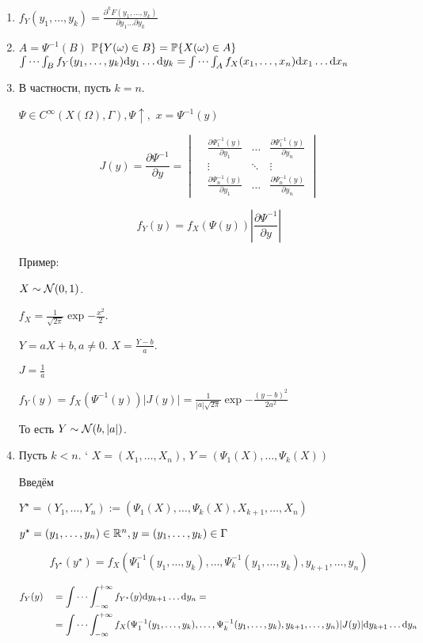 \begin{enumerate}
\def\labelenumi{\arabic{enumi}.}
\item
  \(f_Y (y_1,\ldots,y_k) = \frac{\partial^k F(y_1, \ldots, y_k)}{\partial y_1 \ldots \partial y_k}\)
\item
  \(A = \Psi^{-1}(B)\)
  \(\mathbb P\{ Y(\omega)\in B\} = \mathbb P\{ X(\omega)\in A\}\)
  \(\idotsint_B f_Y(y_1,\ldots,y_k) \mathrm d y_1\ldots \mathrm d y_k = \idotsint_A f_X (x_1,\ldots,x_n) \mathrm d x_1 \ldots \mathrm d x_n\)
\item
  В частности, пусть \(k=n\).

  \(\Psi\in C^{\infty} (X(\Omega), \Gamma), \Psi\uparrow,\)
  \(x = \Psi^{-1}(y)\)

  \[J(y) = \frac{\partial\Psi^{-1}}{\partial y} =
    \begin{vmatrix}
    &\frac{\partial\Psi_1^{-1} (y)}{\partial y_1} & \ldots & \frac{ \partial \Psi_1^{-1}(y)}{\partial y_n} \\
    &\vdots & \ddots & \vdots \\
    &\frac{\partial\Psi_n^{-1} (y)}{\partial y_1} & \ldots & \frac{ \partial \Psi_n^{-1}(y)}{\partial y_n}
    \end{vmatrix}
  \]

  \[f_Y (y) = f_X (\Psi(y)) \left|{\frac{\partial\Psi^{-1}}{\partial y}}\right|\]

  Пример:

  \(X\sim \mathcal N(0,1)\).

  \(f_X = \frac{1}{\sqrt{2\pi}}\exp{-\frac{x^2}{2}}\).

  \(Y = aX + b, a\neq 0\). \(X = \frac{Y-b}{a}\).

  \(J = \frac{1}{a}\)

  \(f_Y(y) = f_X(\Psi^{-1}(y))|J(y)| = \frac{1}{|a|\sqrt{2\pi}} \exp{-\frac{(y-b)^2}{2a^2}}\)

  То есть \(Y\sim \mathcal N(b, |a|)\).
\item
  Пусть \(k < n\). ` \(X = (X_1, \ldots, X_n)\),
  \(Y = (\Psi_1(X), \ldots, \Psi_k(X))\)

  Введём

  \(Y^\star = (Y_1, \ldots, Y_n) := (\Psi_1(X), \ldots, \Psi_k(X), X_{k+1}, \ldots, X_{n})\)

  \({y^\star = (y_1, \ldots, y_n)}\in\mathbb R^n, {y = (y_1,\ldots,y_k) \in\Gamma}\)

  \[f_{Y^\star}(y^\star) = f_X(\Psi_1^{-1}(y_1,\ldots,y_k), \ldots, \Psi_k^{-1}(y_1,\ldots,y_k), y_{k+1}, \ldots, y_{n})\]

  \[\begin{aligned}
    & f_Y(y) &&=
      \idotsint_{-\infty}^{+\infty}
      f_{Y^\star} (y) \mathrm d y_{k+1} \ldots \mathrm d y_{n} = \\
    & &&= \idotsint_{-\infty}^{+\infty}
        f_X(\Psi_1^{-1}(y_1,\ldots,y_k), \ldots, \Psi_k^{-1}(y_1,\ldots,y_k), y_{k+1}, \ldots, y_{n})
        |J(y)|
        \mathrm d y_{k+1} \ldots \mathrm d y_{n}
  \end{aligned}\]
\end{enumerate}
